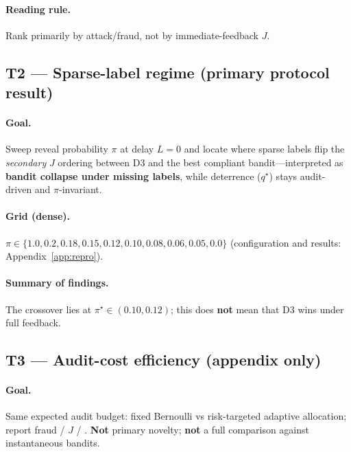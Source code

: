 \documentclass[sigconf,review]{acmart}
\newcommand{\qstar}{q^\star}
\newcommand{\pistar}{\pi^\star}
\begin{document}
\paragraph{Reading rule.} Rank primarily by attack/fraud, not by immediate-feedback $J$.

\subsection*{T2 --- Sparse-label regime (primary protocol result)}

\paragraph{Goal.} Sweep reveal probability $\pi$ at delay $L=0$ and locate where sparse labels flip the \emph{secondary} $J$ ordering between D3 and the best compliant bandit---interpreted as \textbf{bandit collapse under missing labels}, while deterrence ($\qstar$) stays audit-driven and $\pi$-invariant.

\paragraph{Grid (dense).} $\pi \in \{1.0,\allowbreak 0.2,\allowbreak 0.18,\allowbreak 0.15,\allowbreak 0.12,\allowbreak 0.10,\allowbreak 0.08,\allowbreak 0.06,\allowbreak 0.05,\allowbreak 0.0\}$ (configuration and results: Appendix~\ref{app:repro}).

\paragraph{Summary of findings.} The crossover lies at $\pistar \in (0.10, 0.12)$; this does \textbf{not} mean that D3 wins under full feedback.

\subsection*{T3 --- Audit-cost efficiency (appendix only)}

\paragraph{Goal.} Same expected audit budget: fixed Bernoulli vs risk-targeted adaptive allocation; report fraud / $J$ / . \textbf{Not} primary novelty; \textbf{not} a full comparison against instantaneous bandits.
\end{document}

